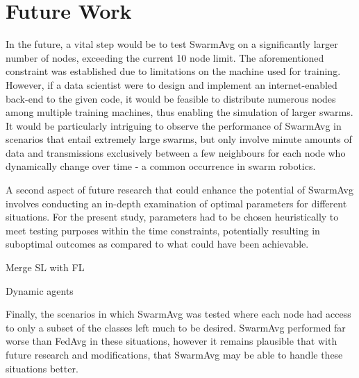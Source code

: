 \section{Future Work}
In the future, a vital step would be to test SwarmAvg on a significantly larger number of nodes, exceeding the current 10 node limit. The aforementioned constraint was established due to limitations on the machine used for training. However, if a data scientist were to design and implement an internet-enabled back-end to the given code, it would be feasible to distribute numerous nodes among multiple training machines, thus enabling the simulation of larger swarms. It would be particularly intriguing to observe the performance of SwarmAvg in scenarios that entail extremely large swarms, but only involve minute amounts of data and transmissions exclusively between a few neighbours for each node who dynamically change over time - a common occurrence in swarm robotics.

A second aspect of future research that could enhance the potential of SwarmAvg involves conducting an in-depth examination of optimal parameters for different situations. For the present study, parameters had to be chosen heuristically to meet testing purposes within the time constraints, potentially resulting in suboptimal outcomes as compared to what could have been achievable.

Merge SL with FL

Dynamic agents

Finally, the scenarios in which SwarmAvg was tested where each node had access to only a subset of the classes left much to be desired. SwarmAvg performed far worse than FedAvg in these situations, however it remains plausible that with future research and modifications, that SwarmAvg may be able to handle these situations better.